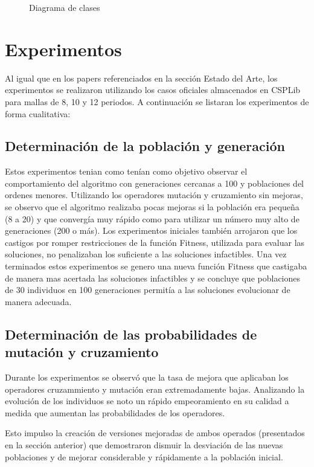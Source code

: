 \documentclass[letter, 10pt]{article}
\begin{document}
\begin{figure}[h]
  \centering
  \caption{Diagrama de clases}
\end{figure}

\section{Experimentos}
\label{experimentos}
Al igual que en los papers referenciados en la sección Estado del Arte, los
experimentos se realizaron utilizando los casos oficiales almacenados en CSPLib
para mallas de 8, 10 y 12 periodos. A continuación se listaran los experimentos
de forma cualitativa:

\subsection{Determinación de la población y generación}
Estos experimentos tenian como tenían como objetivo observar el comportamiento
del algoritmo con generaciones cercanas a 100 y poblaciones del ordenes menores.
Utilizando los operadores mutación y cruzamiento sin mejoras, se observo que el
algoritmo realizaba pocas mejoras si la población era pequeña (8 a 20) y que
convergía muy rápido como para utilizar un número muy alto de generaciones (200
o más). Los experimentos iniciales también arrojaron que los castigos por romper
restricciones de la función Fitness, utilizada para evaluar las soluciones, no
penalizaban los suficiente a las soluciones infactibles. Una vez terminados
estos experimentos se genero una nueva función Fitness que castigaba de manera
mas acertada las soluciones infactibles y se concluye que poblaciones de 30 individuos en
100 generaciones permitía a las soluciones evolucionar de manera adecuada.

\subsection{Determinación de las probabilidades de mutación y cruzamiento}
Durante los experimentos se observó que la tasa de mejora que aplicaban los
operadores cruzammiento y mutación eran extremadamente bajas. Analizando la
evolución de los individuos se noto un rápido empeoramiento en su calidad a
medida que aumentan las probabilidades de los operadores.

Esto impulso la creación de versiones mejoradas de ambos operados (presentados
en la sección anterior) que demostraron dismuir la desviación de las nuevas
poblaciones y de mejorar considerable y rápidamente a la población inicial.
\end{document}
